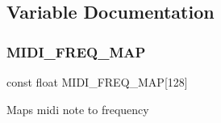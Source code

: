 \subsection{Variable Documentation}
\mbox{\label{fofi~_8c_a3b64319dc2461e1ebcf429be2df27671}} 
\subsubsection{\texorpdfstring{MIDI\_FREQ\_MAP}{MIDI\_FREQ\_MAP}}
{\footnotesize\ttfamily const float M\+I\+D\+I\+\_\+\+F\+R\+E\+Q\+\_\+\+M\+AP\mbox{[}128\mbox{]}}

Maps midi note to frequency 